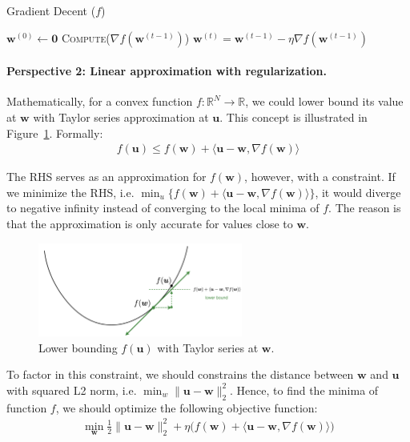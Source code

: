 \documentclass[11pt]{article}
\newcommand{\bw}{\boldsymbol{w}}
\newcommand{\bu}{\boldsymbol{u}}
\begin{document}
\begin{algorithm}[H]
\caption{Gradient Decent ($f$)}
\label{algo:gd}
\begin{algorithmic}[1]
\STATE $\bw^{(0)} \leftarrow \boldsymbol{0}$
\STATE \textsc{Compute}($\nabla f(\bw^{(t-1)})$)
\STATE $\bw^{(t)} = \bw^{(t-1)} - \eta \nabla f(\bw^{(t-1)})$
\ENDFOR
\end{algorithmic}
\end{algorithm}

\paragraph{Perspective 2: Linear approximation with regularization.}
Mathematically, for a convex function $f:\mathbb{R}^N \rightarrow \mathbb{R}$, we could lower bound its value at $\bw$ with Taylor series approximation at $\bu$. This concept is illustrated in Figure~\ref{fig:GD_lin_apprx}. Formally:
\begin{equation*}
\begin{split}
f(\bu) \leq f(\bw) + \langle \bu-\bw, \nabla f(\bw) \rangle
\end{split}
\end{equation*}


The RHS serves as an approximation for $f(\bw)$, however, with a constraint. If we minimize the RHS, i.e. $\min_u \{ f(\bw) + \langle \bu-\bw, \nabla f(\bw) \rangle \}$, it would diverge to negative infinity instead of converging to the local minima of $f$. The reason is that the approximation is only accurate for values close to $\bw$.

\begin{figure}[H]
    \centering
    \includegraphics[width=0.6\textwidth]{Img/GD_lin_apprx.png}
    \caption{Lower bounding $f(\bu)$ with Taylor series at $\bw$.}
    \label{fig:GD_lin_apprx}
\end{figure}

To factor in this constraint, we should constrains the distance between $\bw$ and $\bu$ with squared L2 norm, i.e. $\min_w \| \bu - \bw \|_2^2$. Hence, to find the minima of function $f$, we should optimize the following objective function: 
\begin{equation*}
\begin{split}
\min_{\bw} \frac{1}{2} \| \bu - \bw \|_2^2 
+ \eta\Big(f(\bw) + \langle \bu-\bw, \nabla f(\bw) \rangle \Big)
\end{split}
\end{equation*}
\end{document}
